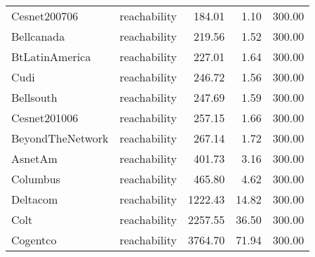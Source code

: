 \begin{tabular}{llrrr}
Cesnet200706 & reachability & 184.01 & 1.10 & 300.00 \\
Bellcanada & reachability & 219.56 & 1.52 & 300.00 \\
BtLatinAmerica & reachability & 227.01 & 1.64 & 300.00 \\
Cudi & reachability & 246.72 & 1.56 & 300.00 \\
Bellsouth & reachability & 247.69 & 1.59 & 300.00 \\
Cesnet201006 & reachability & 257.15 & 1.66 & 300.00 \\
BeyondTheNetwork & reachability & 267.14 & 1.72 & 300.00 \\
AsnetAm & reachability & 401.73 & 3.16 & 300.00 \\
Columbus & reachability & 465.80 & 4.62 & 300.00 \\
Deltacom & reachability & 1222.43 & 14.82 & 300.00 \\
Colt & reachability & 2257.55 & 36.50 & 300.00 \\
Cogentco & reachability & 3764.70 & 71.94 & 300.00 \\
\bottomrule
\end{tabular}
